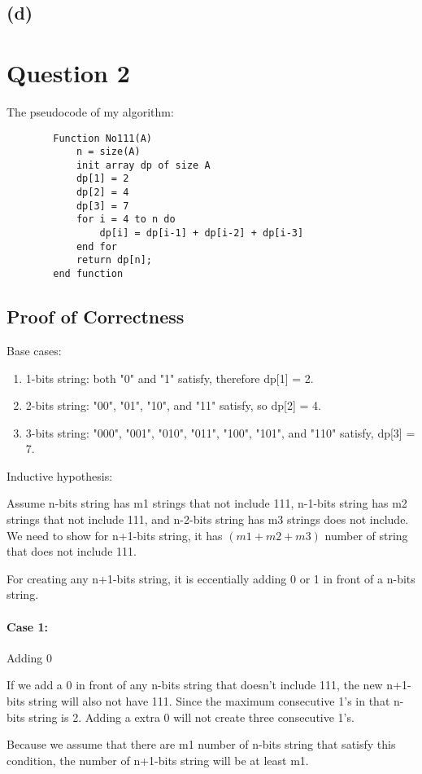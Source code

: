 \documentclass{article}
\begin{document}
\subsection*{(d)}


\section*{Question 2}
The pseudocode of my algorithm:
    \begin{verbatim}
        Function No111(A)
            n = size(A)
            init array dp of size A
            dp[1] = 2
            dp[2] = 4
            dp[3] = 7
            for i = 4 to n do
                dp[i] = dp[i-1] + dp[i-2] + dp[i-3]
            end for
            return dp[n];
        end function
    \end{verbatim}
\subsection*{Proof of Correctness}
Base cases:
\begin{enumerate}
    \item 1-bits string: both "0" and "1" satisfy, therefore dp[1] = 2.
    \item 2-bits string: "00", "01", "10", and "11" satisfy, so dp[2] = 4.
    \item 3-bits string: "000", "001", "010", "011", "100", "101", and "110" satisfy, dp[3] = 7.
\end{enumerate}
Inductive hypothesis:

Assume n-bits string has m1 strings that not include 111, n-1-bits string has m2 strings that not include 111, and n-2-bits string has m3 strings does not include.
We need to show for n+1-bits string, it has $(m1+m2+m3)$ number of string that does not include 111.

For creating any n+1-bits string, it is eccentially adding 0 or 1 in front of a n-bits string.
\paragraph*{Case 1:} Adding 0

If we add a 0 in front of any n-bits string that doesn't include 111, the new n+1-bits string will also not have 111.
Since the maximum consecutive 1's in that n-bits string is 2. Adding a extra 0 will not create three consecutive 1's.

Because we assume that there are m1 number of n-bits string that satisfy this condition, the number of n+1-bits string
will be at least m1.
\end{document}
